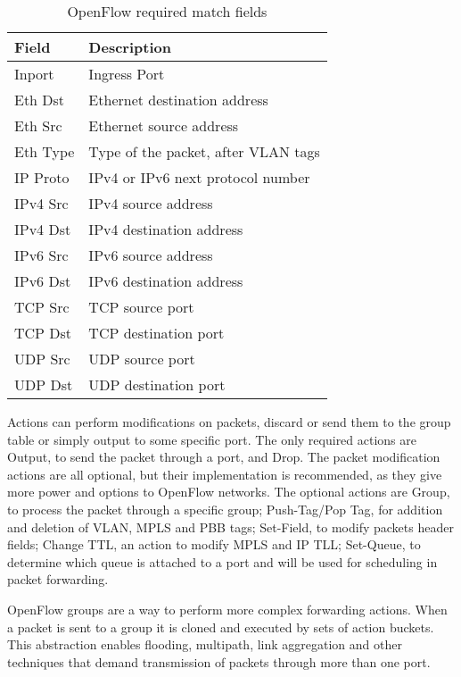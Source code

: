 \begin{table}[h!]
\caption{OpenFlow required match fields}\label{tab:OFRequired}
\centering
\begin{tabular}{|l|l|}
\hline
\textbf{Field} & \textbf{Description}                \\ \hline
Inport         & Ingress Port                        \\ \hline
Eth Dst        & Ethernet destination address         \\ \hline
Eth Src        & Ethernet source address              \\ \hline
Eth Type       & Type of the packet, after VLAN tags \\ \hline
IP Proto       & IPv4 or IPv6 next protocol number   \\ \hline
IPv4 Src       & IPv4 source address                 \\ \hline
IPv4 Dst       & IPv4 destination address             \\ \hline
IPv6 Src       & IPv6 source address                 \\ \hline
IPv6 Dst       & IPv6 destination address            \\ \hline
TCP Src        & TCP source port                     \\ \hline
TCP Dst        & TCP destination port                \\ \hline
UDP Src        & UDP source port                     \\ \hline
UDP Dst        & UDP destination port                \\ \hline
\end{tabular}
\label{my-label}
\end{table}

Actions can perform modifications on packets, discard or send them to the group table or simply output to some specific port. The only required actions are Output, to send the packet through a port, and Drop. The packet modification actions are all optional, but their implementation is recommended, as they give more power and options to OpenFlow networks. The optional actions are Group, to process the packet through a specific group; Push-Tag/Pop Tag, for addition and deletion of VLAN, MPLS and PBB tags; Set-Field, to modify packets header fields; Change TTL, an action to modify MPLS and IP TLL; Set-Queue, to determine which queue is attached to a port and will be used for scheduling in packet forwarding.

OpenFlow groups are a way to perform more complex forwarding actions. When a packet is sent to a group it is cloned and executed by sets of action buckets. This abstraction enables flooding, multipath, link aggregation and other techniques that demand transmission of packets through more than one port. 

